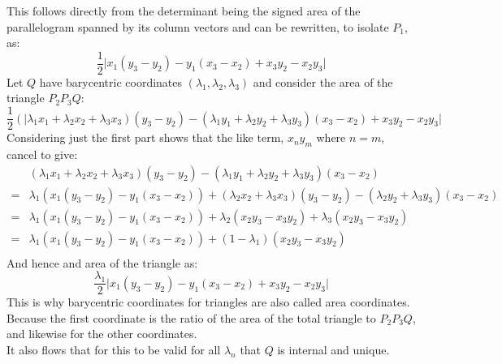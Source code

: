 This follows directly from the determinant being the signed area of the parallelogram spanned by its column vectors and can be rewritten, to isolate $P_1$, as:
\[\frac{1}{2}\big|x_1(y_3-y_2)-y_1(x_3-x_2)+x_3y_2-x_2y_3\big|\]
Let $Q$ have barycentric coordinates $(\lambda_1,\lambda_2,\lambda_3)$ and consider the area of the triangle $P_2P_3Q$:
\[\frac{1}{2}(\big|\lambda_1x_1+ \lambda_2x_2 + \lambda_3x_3)(y_3-y_2)-(\lambda_1y_1+ \lambda_2y_2 + \lambda_3y_3)(x_3-x_2)+x_3y_2-x_2y_3\big|\]
Considering just the first part shows that the like term, $x_ny_m$ where $n=m$, cancel to give:
\begin{equation*}
\begin{aligned}
	&(\lambda_1x_1+ \lambda_2x_2 + \lambda_3x_3)(y_3-y_2)-(\lambda_1y_1+ \lambda_2y_2 + \lambda_3y_3)(x_3-x_2)\\
	=&\lambda_1(x_1(y_3-y_2)-y_1(x_3-x_2))+ (\lambda_2x_2 + \lambda_3x_3)(y_3-y_2)-(\lambda_2y_2 + \lambda_3y_3)(x_3-x_2)\\
	=&\lambda_1(x_1(y_3-y_2)-y_1(x_3-x_2))+ \lambda_2(x_2y_3-x_3y_2) +\lambda_3(x_2y_3-x_3y_2)\\
	=&\lambda_1(x_1(y_3-y_2)-y_1(x_3-x_2))+ (1-\lambda_1)(x_2y_3-x_3y_2)\\
\end{aligned}
\end{equation*}
And hence and area of the triangle as:
\[\frac{\lambda_1}{2}\big|x_1(y_3-y_2)-y_1(x_3-x_2)+x_3y_2-x_2y_3\big|\]
This is why barycentric coordinates for triangles are also called area coordinates.
Because the first coordinate is the ratio of the area of the total triangle to $P_2P_3Q$,
and likewise for the other coordinates.
\\

It also flows that for this to be valid for all $\lambda_n$ that $Q$ is internal and unique.


%
